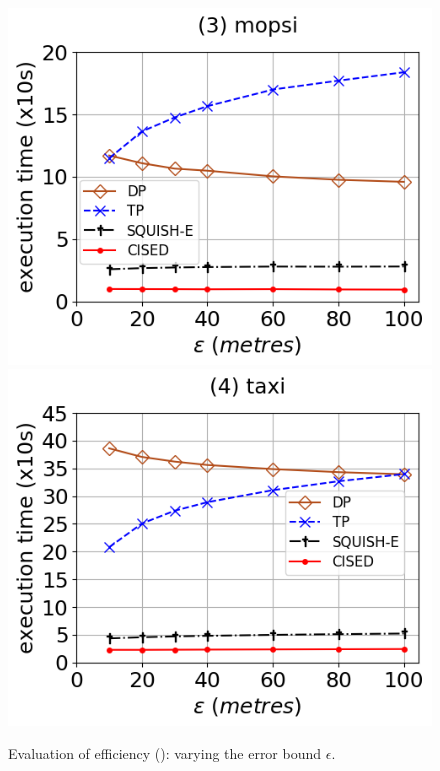 \begin{figure}[tb!]
	\includegraphics[scale=0.315]{Figures/Exp-SED-time-epsilon-mopsi.png}	\hspace{1ex}
	\includegraphics[scale=0.315]{Figures/Exp-SED-time-epsilon-taxi.png}	\hspace{1ex}
	\vspace{-2.5ex}
	\caption{\small Evaluation of efficiency (\sed): varying the error bound $\epsilon$.}\label{fig:time-epsilon-sed}
	\vspace{-2ex}
\end{figure}

